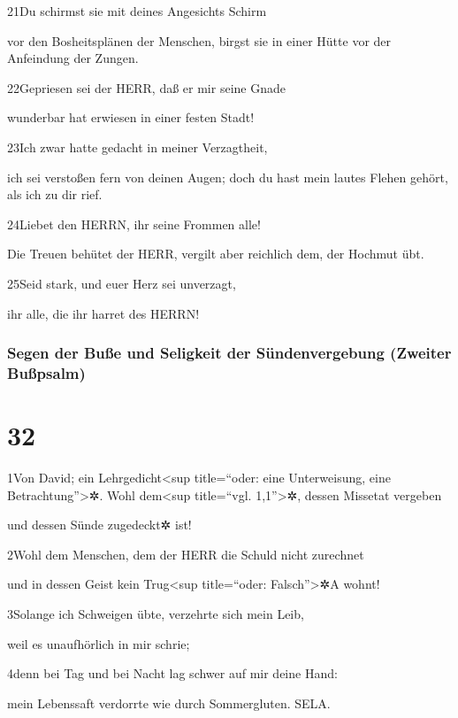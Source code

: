 21Du schirmst sie mit deines Angesichts Schirm

vor den Bosheitsplänen der Menschen, birgst sie in einer Hütte vor der
Anfeindung der Zungen.

22Gepriesen sei der HERR, daß er mir seine Gnade

wunderbar hat erwiesen in einer festen Stadt!

23Ich zwar hatte gedacht in meiner Verzagtheit,

ich sei verstoßen fern von deinen Augen; doch du hast mein lautes Flehen
gehört, als ich zu dir rief.

24Liebet den HERRN, ihr seine Frommen alle!

Die Treuen behütet der HERR, vergilt aber reichlich dem, der Hochmut
übt.

25Seid stark, und euer Herz sei unverzagt,

ihr alle, die ihr harret des HERRN!

\hypertarget{segen-der-buuxdfe-und-seligkeit-der-suxfcndenvergebung-zweiter-buuxdfpsalm}{%
\subsubsection{Segen der Buße und Seligkeit der Sündenvergebung (Zweiter
Bußpsalm)}\label{segen-der-buuxdfe-und-seligkeit-der-suxfcndenvergebung-zweiter-buuxdfpsalm}}

\hypertarget{section-31}{%
\section{32}\label{section-31}}

1Von David; ein Lehrgedicht\textless sup title=``oder: eine
Unterweisung, eine Betrachtung''\textgreater✲. Wohl dem\textless sup
title=``vgl. 1,1''\textgreater✲, dessen Missetat vergeben

und dessen Sünde zugedeckt✲ ist!

2Wohl dem Menschen, dem der HERR die Schuld nicht zurechnet

und in dessen Geist kein Trug\textless sup title=``oder:
Falsch''\textgreater✲{A} wohnt!

3Solange ich Schweigen übte, verzehrte sich mein Leib,

weil es unaufhörlich in mir schrie;

4denn bei Tag und bei Nacht lag schwer auf mir deine Hand:

mein Lebenssaft verdorrte wie durch Sommergluten. SELA.

